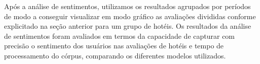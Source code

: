 Após a análise de sentimentos, utilizamos os resultados agrupados por períodos de modo a conseguir visualizar em modo gráfico as avaliações divididas conforme explicitado na seção anterior para um grupo de hotéis. Os resultados da análise de sentimentos foram avaliados em termos da capacidade de capturar com precisão o sentimento dos usuários nas avaliações de hotéis e tempo de processamento do córpus, comparando os diferentes modelos utilizados.
